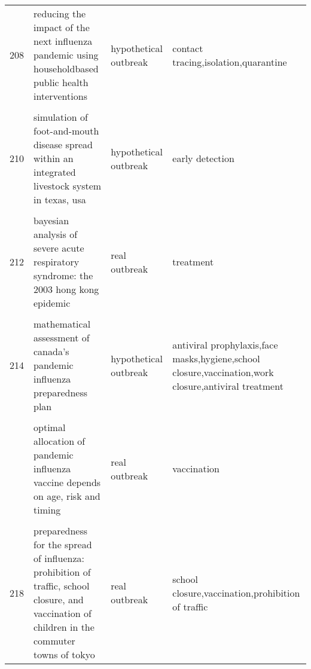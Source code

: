 \documentclass[
]{article}
\begin{document}
\begin{landscape}
\begin{longtable}{l>{\raggedright\arraybackslash}p{3cm}l>{\raggedright\arraybackslash}p{8cm}}
208 & reducing the impact of the next influenza pandemic using householdbased public health interventions & hypothetical outbreak & contact tracing,isolation,quarantine\\
\cellcolor{gray!6}{209} & \cellcolor{gray!6}{seasonal transmission potential and activity peaks of the new influenza a(h1n1): a monte carlo likelihood analysis based on human mobility} & \cellcolor{gray!6}{real outbreak} & \cellcolor{gray!6}{treatment}\\
210 & simulation of foot-and-mouth disease spread within an integrated livestock system in texas, usa & hypothetical outbreak & early detection\\
\addlinespace
\cellcolor{gray!6}{211} & \cellcolor{gray!6}{the transmissibility and control of pandemic influenza a (h1n1) virus} & \cellcolor{gray!6}{real outbreak} & \cellcolor{gray!6}{vaccination}\\
212 & bayesian analysis of severe acute respiratory syndrome: the 2003 hong kong epidemic & real outbreak & treatment\\
\cellcolor{gray!6}{213} & \cellcolor{gray!6}{hepatitis b vaccination and changes in sexual risk behaviour among men who have sex with men in amsterdam} & \cellcolor{gray!6}{hypothetical outbreak} & \cellcolor{gray!6}{vaccination}\\
214 & mathematical assessment of canada's pandemic influenza preparedness plan & hypothetical outbreak & antiviral prophylaxis,face masks,hygiene,school closure,vaccination,work closure,antiviral treatment\\
\cellcolor{gray!6}{215} & \cellcolor{gray!6}{modeling targeted layered containment of an influenza pandemic in the united states} & \cellcolor{gray!6}{hypothetical outbreak} & \cellcolor{gray!6}{antiviral prophylaxis,quarantine,distancing,school closure,screening,work closure}\\
\addlinespace
216 & optimal allocation of pandemic influenza vaccine depends on age, risk and timing & real outbreak & vaccination\\
\cellcolor{gray!6}{217} & \cellcolor{gray!6}{pandemic simulation of antivirals plus school closures: buying time until strain-specific vaccine is available} & \cellcolor{gray!6}{hypothetical outbreak} & \cellcolor{gray!6}{antiviral prophylaxis,school closure,vaccination}\\
218 & preparedness for the spread of influenza: prohibition of traffic, school closure, and vaccination of children in the commuter towns of tokyo & real outbreak & school closure,vaccination,prohibition of traffic\\

\end{longtable}
\end{landscape}
\end{document}
